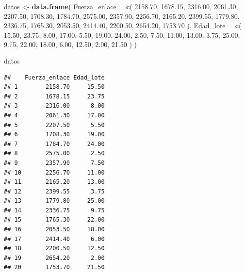 \documentclass[
]{book}
\newenvironment{Shaded}{\begin{snugshade}}{\end{snugshade}}
\newcommand{\AttributeTok}[1]{\textcolor[rgb]{0.13,0.29,0.53}{#1}}
\newcommand{\FloatTok}[1]{\textcolor[rgb]{0.00,0.00,0.81}{#1}}
\newcommand{\FunctionTok}[1]{\textcolor[rgb]{0.13,0.29,0.53}{\textbf{#1}}}
\newcommand{\NormalTok}[1]{#1}
\newcommand{\OtherTok}[1]{\textcolor[rgb]{0.56,0.35,0.01}{#1}}
\begin{document}
\begin{Shaded}
\begin{Highlighting}[]
\NormalTok{datos }\OtherTok{\textless{}{-}} \FunctionTok{data.frame}\NormalTok{(}
  \AttributeTok{Fuerza\_enlace =} \FunctionTok{c}\NormalTok{(}
    \FloatTok{2158.70}\NormalTok{, }\FloatTok{1678.15}\NormalTok{, }\FloatTok{2316.00}\NormalTok{, }\FloatTok{2061.30}\NormalTok{, }\FloatTok{2207.50}\NormalTok{,}
    \FloatTok{1708.30}\NormalTok{, }\FloatTok{1784.70}\NormalTok{, }\FloatTok{2575.00}\NormalTok{, }\FloatTok{2357.90}\NormalTok{, }\FloatTok{2256.70}\NormalTok{,}
    \FloatTok{2165.20}\NormalTok{, }\FloatTok{2399.55}\NormalTok{, }\FloatTok{1779.80}\NormalTok{, }\FloatTok{2336.75}\NormalTok{, }\FloatTok{1765.30}\NormalTok{,}
    \FloatTok{2053.50}\NormalTok{, }\FloatTok{2414.40}\NormalTok{, }\FloatTok{2200.50}\NormalTok{, }\FloatTok{2654.20}\NormalTok{, }\FloatTok{1753.70}
\NormalTok{  ),}
  \AttributeTok{Edad\_lote =} \FunctionTok{c}\NormalTok{(}
    \FloatTok{15.50}\NormalTok{, }\FloatTok{23.75}\NormalTok{, }\FloatTok{8.00}\NormalTok{, }\FloatTok{17.00}\NormalTok{, }\FloatTok{5.50}\NormalTok{,}
    \FloatTok{19.00}\NormalTok{, }\FloatTok{24.00}\NormalTok{, }\FloatTok{2.50}\NormalTok{, }\FloatTok{7.50}\NormalTok{, }\FloatTok{11.00}\NormalTok{,}
    \FloatTok{13.00}\NormalTok{, }\FloatTok{3.75}\NormalTok{, }\FloatTok{25.00}\NormalTok{, }\FloatTok{9.75}\NormalTok{, }\FloatTok{22.00}\NormalTok{,}
    \FloatTok{18.00}\NormalTok{, }\FloatTok{6.00}\NormalTok{, }\FloatTok{12.50}\NormalTok{, }\FloatTok{2.00}\NormalTok{, }\FloatTok{21.50}
\NormalTok{  )}
\NormalTok{)}

\NormalTok{datos}
\end{Highlighting}
\end{Shaded}

\begin{verbatim}
##    Fuerza_enlace Edad_lote
## 1        2158.70     15.50
## 2        1678.15     23.75
## 3        2316.00      8.00
## 4        2061.30     17.00
## 5        2207.50      5.50
## 6        1708.30     19.00
## 7        1784.70     24.00
## 8        2575.00      2.50
## 9        2357.90      7.50
## 10       2256.70     11.00
## 11       2165.20     13.00
## 12       2399.55      3.75
## 13       1779.80     25.00
## 14       2336.75      9.75
## 15       1765.30     22.00
## 16       2053.50     18.00
## 17       2414.40      6.00
## 18       2200.50     12.50
## 19       2654.20      2.00
## 20       1753.70     21.50
\end{verbatim}
\end{document}
